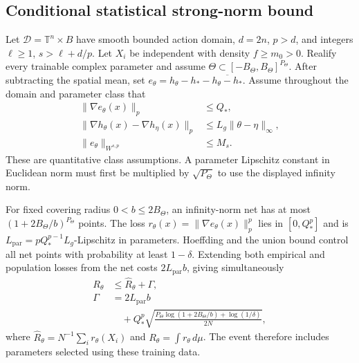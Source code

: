 \subsection{Conditional statistical strong-norm bound}
Let $\mathcal D=\mathbb T^n\times B$ have smooth bounded action domain, $d=2n$, $p>d$, and integers $\ell\ge1$, $s>\ell+d/p$. Let $X_i$ be independent with density $f\ge m_0>0$. Realify every trainable complex parameter and assume $\Theta\subset[-B_\Theta,B_\Theta]^{P_\Theta}$. After subtracting the spatial mean, set $e_\theta=h_\theta-h_*-\overline{h_\theta-h_*}$. Assume throughout the domain and parameter class that
\begin{align}
 \|\nabla e_\theta(x)\|_p&\le Q_*,\nonumber\\
 \|\nabla h_\theta(x)-\nabla h_\eta(x)\|_p
 &\le L_g\|\theta-\eta\|_\infty,\nonumber\\
 \|e_\theta\|_{W^{s,p}}&\le M_s.
 \label{eq:supp-learn-stat-assumptions}
\end{align}
These are quantitative class assumptions. A parameter Lipschitz constant in Euclidean norm must first be multiplied by $\sqrt{P_\Theta}$ to use the displayed infinity norm.

For fixed covering radius $0<b\le2B_\Theta$, an infinity-norm net has at most $(1+2B_\Theta/b)^{P_\Theta}$ points. The loss $r_\theta(x)=\|\nabla e_\theta(x)\|_p^p$ lies in $[0,Q_*^p]$ and is $L_{\mathrm{par}}=pQ_*^{p-1}L_g$-Lipschitz in parameters. Hoeffding and the union bound control all net points with probability at least $1-\delta$. Extending both empirical and population losses from the net costs $2L_{\mathrm{par}}b$, giving simultaneously
\begin{equation}
 \begin{aligned}
 R_\theta&\le\widehat R_\theta+\Gamma,\\
 \Gamma&=2L_{\mathrm{par}}b\\
 &\quad+Q_*^p\sqrt{\frac{P_\Theta\log(1+2B_\Theta/b)+\log(1/\delta)}{2N}},
 \end{aligned}
 \label{eq:supp-learn-covering}
\end{equation}
where $\widehat R_\theta=N^{-1}\sum_i r_\theta(X_i)$ and $R_\theta=\int r_\theta\,d\mu$. The event therefore includes parameters selected using these training data.


